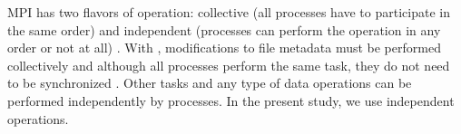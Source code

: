 MPI has two flavors of operation: collective (all processes have to participate in the same order) and independent (processes can perform the operation in any order or not at all) \cite{pythonhdf5}.
With , modifications to file metadata must be performed collectively and although all processes perform the same task, they do not need to be synchronized \cite{pythonhdf5}. 
Other tasks and any type of data operations can be performed independently by processes.
In the present study, we use independent operations.
